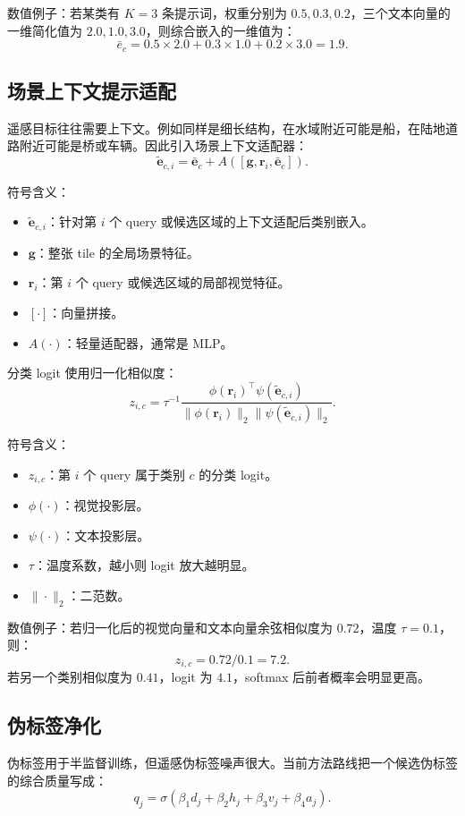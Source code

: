 \documentclass[11pt,a4paper]{ctexart}
\begin{document}
数值例子：若某类有 $K=3$ 条提示词，权重分别为 $0.5,0.3,0.2$，三个文本向量的一维简化值为 $2.0,1.0,3.0$，则综合嵌入的一维值为：
\[
\bar e_c=0.5\times2.0+0.3\times1.0+0.2\times3.0=1.9.
\]

\subsection{场景上下文提示适配}

遥感目标往往需要上下文。例如同样是细长结构，在水域附近可能是船，在陆地道路附近可能是桥或车辆。因此引入场景上下文适配器：
\[
\tilde{\bm e}_{c,i}=\bar{\bm e}_c+A([\bm g,\bm r_i,\bar{\bm e}_c]).
\]

符号含义：
\begin{itemize}
  \item $\tilde{\bm e}_{c,i}$：针对第 $i$ 个 query 或候选区域的上下文适配后类别嵌入。
  \item $\bm g$：整张 tile 的全局场景特征。
  \item $\bm r_i$：第 $i$ 个 query 或候选区域的局部视觉特征。
  \item $[\cdot]$：向量拼接。
  \item $A(\cdot)$：轻量适配器，通常是 MLP。
\end{itemize}

分类 logit 使用归一化相似度：
\[
z_{i,c}=\tau^{-1}
\frac{\phi(\bm r_i)^\top \psi(\tilde{\bm e}_{c,i})}
{\|\phi(\bm r_i)\|_2\|\psi(\tilde{\bm e}_{c,i})\|_2}.
\]

符号含义：
\begin{itemize}
  \item $z_{i,c}$：第 $i$ 个 query 属于类别 $c$ 的分类 logit。
  \item $\phi(\cdot)$：视觉投影层。
  \item $\psi(\cdot)$：文本投影层。
  \item $\tau$：温度系数，越小则 logit 放大越明显。
  \item $\|\cdot\|_2$：二范数。
\end{itemize}

数值例子：若归一化后的视觉向量和文本向量余弦相似度为 $0.72$，温度 $\tau=0.1$，则：
\[
z_{i,c}=0.72/0.1=7.2.
\]
若另一个类别相似度为 $0.41$，logit 为 $4.1$，softmax 后前者概率会明显更高。

\subsection{伪标签净化}

伪标签用于半监督训练，但遥感伪标签噪声很大。当前方法路线把一个候选伪标签的综合质量写成：
\[
q_j=\sigma(\beta_1d_j+\beta_2h_j+\beta_3v_j+\beta_4a_j).
\]
\end{document}
